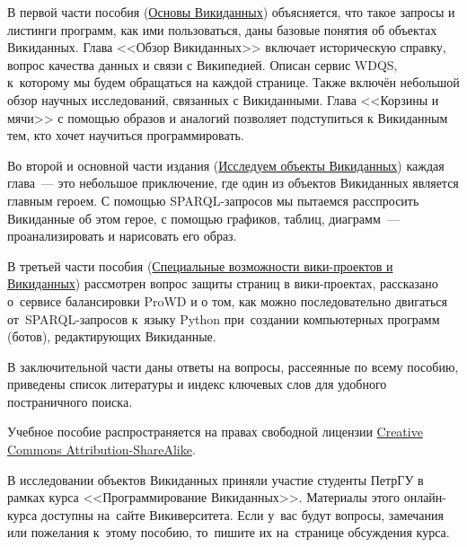 В первой части пособия (\hyperref[part:foundation]{Основы Викиданных}) объясняется, 
что такое запросы и листинги программ, как ими пользоваться, даны базовые понятия об объектах Викиданных. 
Глава <<Обзор Викиданных>> включает историческую справку, 
вопрос качества данных и связи с Википедией. 
Описан сервис WDQS, к~которому мы будем обращаться на каждой странице. 
Также включён небольшой обзор научных исследований, связанных с Викиданными. 
Глава <<Корзины и мячи>> с помощью образов и аналогий позволяет подступиться к Викиданным тем, 
кто хочет научиться программировать. 


Во второй и основной части издания (\hyperref[part:research]{Исследуем объекты Викиданных}) каждая 
глава~--- это небольшое приключение, 
где один из объектов Викиданных является главным героем. 
С помощью SPARQL-запросов мы пытаемся расспросить Викиданные об этом герое, 
с помощью графиков, таблиц, диаграмм~--- проанализировать и нарисовать его образ. 



\newpage
В третьей части пособия (\hyperref[part:advanced]
                                  {Специальные возможности вики-проектов и Викиданных}) 
рассмотрен вопрос защиты страниц в вики-проектах, 
рассказано о~сервисе балансировки ProWD и о том, 
как можно последовательно двигаться от~SPARQL-запросов 
к~языку Python при~создании компьютерных программ (ботов), редактирующих Викиданные. 


В заключительной части 
даны ответы на вопросы, рассеянные по всему пособию, приведены список литературы 
и индекс ключевых слов для удобного постраничного поиска.


Учебное пособие распространяется на правах свободной лицензии 
\href{https://creativecommons.org/licenses/by-sa/4.0/deed.ru}{Creative Commons Attribution-ShareAlike}.


В исследовании объектов Викиданных приняли участие студенты ПетрГУ 
в рамках курса <<Программирование Викиданных>>. 
Материалы этого онлайн-курса доступны на~сайте Викиверситета. 
Если у~вас будут вопросы, замечания или пожелания к~этому пособию, 
то~пишите их на~странице обсуждения курса. 

